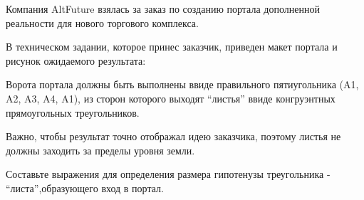 
Компания AltFuture взялась за заказ по созданию портала дополненной реальности для нового торгового комплекса. 

В техническом задании, которое принес заказчик,  приведен макет портала и рисунок ожидаемого результата:

\begin{figure}[h]
    \begin{minipage}[h]{0.49\linewidth}
    \end{minipage}
    \hfill
    \begin{minipage}[h]{0.49\linewidth}
    \end{minipage}
\end{figure}

Ворота портала должны быть выполнены ввиде правильного пятиугольника (A1, A2, A3, A4, A1), из сторон которого выходят “листья” ввиде конгруэнтных  прямоугольных треугольников.

Важно, чтобы результат  точно отображал идею заказчика, поэтому листья не должны заходить за пределы уровня земли. 

Составьте выражения для определения размера гипотенузы треугольника - “листа”,образующего вход в портал.